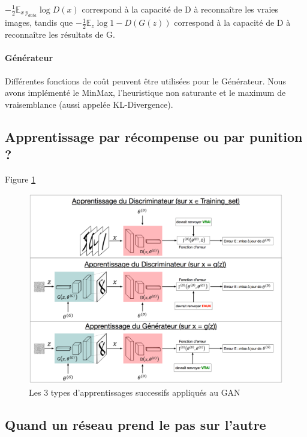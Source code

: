 $-\frac{1}{2}\mathbb{E}_{x~p_{data}}\log{D(x)}$ correspond à la capacité de D à reconnaître les vraies images, tandis que $-\frac{1}{2}\mathbb{E}_{z}\log{1-D(G(z))}$ correspond à la capacité de D à reconnaître les résultats de G.

\paragraph{Générateur}
Différentes fonctions de coût peuvent être utilisées pour le Générateur. Nous avons implémenté le MinMax, l'heuristique non saturante et le maximum de vraisemblance (aussi appelée KL-Divergence). 

\subsection{Apprentissage par récompense ou par punition ?}
Figure \ref{fig:type-appr-GAN}
\begin{figure}[!h]
\begin{center}
\includegraphics[width=1\textwidth]{images/Colloque/GAN/apprentissage.png}
\caption{Les 3 types d'apprentissages successifs appliqués au GAN}
\label{fig:type-appr-GAN}
\end{center}
\end{figure} 
\subsection{Quand un réseau prend le pas sur l'autre}
